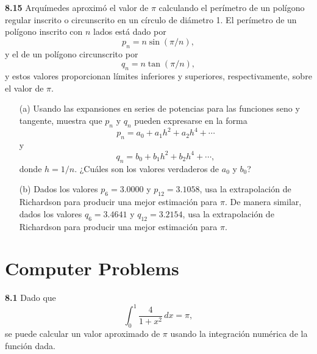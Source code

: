 \documentclass{article}
\begin{document}
\textbf{8.15} Arquímedes aproximó el valor de \(\pi\) calculando el perímetro de un polígono regular inscrito o circunscrito en un círculo de diámetro 1. El perímetro de un polígono inscrito con \(n\) lados está dado por
\[
p_n = n \sin(\pi/n),
\]
y el de un polígono circunscrito por
\[
q_n = n \tan(\pi/n),
\]
y estos valores proporcionan límites inferiores y superiores, respectivamente, sobre el valor de \(\pi\).
\begin{itemize}
    \item[(a)] Usando las expansiones en series de potencias para las funciones seno y tangente, muestra que \(p_n\) y \(q_n\) pueden expresarse en la forma
    \[
    p_n = a_0 + a_1 h^2 + a_2 h^4 + \cdots
    \]
    y
    \[
    q_n = b_0 + b_1 h^2 + b_2 h^4 + \cdots,
    \]
    donde \(h = 1/n\). ¿Cuáles son los valores verdaderos de \(a_0\) y \(b_0\)?
    \item[(b)] Dados los valores \(p_6 = 3.0000\) y \(p_{12} = 3.1058\), usa la extrapolación de Richardson para producir una mejor estimación para \(\pi\). De manera similar, dados los valores \(q_6 = 3.4641\) y \(q_{12} = 3.2154\), usa la extrapolación de Richardson para producir una mejor estimación para \(\pi\).
\end{itemize}

\section{Computer Problems}
\textbf{8.1} Dado que
\[
\int_0^1 \frac{4}{1 + x^2} \, dx = \pi,
\]
se puede calcular un valor aproximado de \(\pi\) usando la integración numérica de la función dada.
\end{document}
